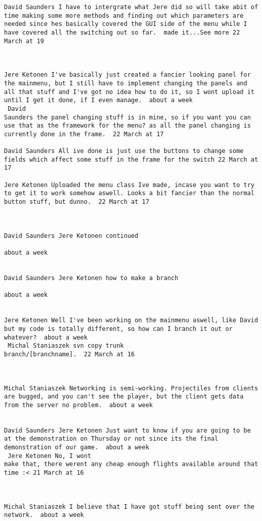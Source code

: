 \begin{verbatim}
David Saunders I have to intergrate what Jere did so will take abit of
time making some more methods and finding out which parameters are
needed since hes basically covered the GUI side of the menu while I
have covered all the switching out so far.  made it...See more 22
March at 19



Jere Ketonen I've basically just created a fancier looking panel for
the mainmenu, but I still have to implement changing the panels and
all that stuff and I've got no idea how to do it, so I wont upload it
until I get it done, if I even manage.  about a week 
 David
Saunders the panel changing stuff is in mine, so if you want you can
use that as the framework for the menu? as all the panel changing is
currently done in the frame.  22 March at 17

David Saunders All ive done is just use the buttons to change some
fields which affect some stuff in the frame for the switch 22 March at
17

Jere Ketonen Uploaded the menu class Ive made, incase you want to try
to get it to work somehow aswell. Looks a bit fancier than the normal
button stuff, but dunno.  22 March at 17



David Saunders Jere Ketonen continued

about a week 


David Saunders Jere Ketonen how to make a branch

about a week 


Jere Ketonen Well I've been working on the mainmenu aswell, like David
but my code is totally different, so how can I branch it out or
whatever?  about a week 
 Michal Staniaszek svn copy trunk
branch/[branchname].  22 March at 16



Michal Staniaszek Networking is semi-working. Projectiles from clients
are bugged, and you can't see the player, but the client gets data
from the server no problem.  about a week 


David Saunders Jere Ketonen Just want to know if you are going to be
at the demonstration on Thursday or not since its the final
demonstration of our game.  about a week 
 Jere Ketonen No, I wont
make that, there werent any cheap enough flights available around that
time :< 21 March at 16



Michal Staniaszek I believe that I have got stuff being sent over the
network.  about a week 



\end{verbatim}
